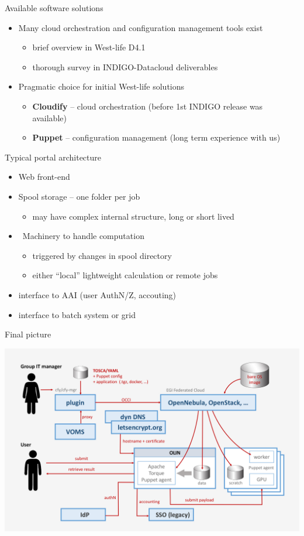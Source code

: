 \documentclass[smaller,t]{beamer}
\begin{document}
\begin{frame}{Available software solutions}
\begin{itemize}
\item Many cloud orchestration and configuration management tools exist
\begin{itemize}
\item brief overview in West-life D4.1
\item thorough survey in INDIGO-Datacloud deliverables
\end{itemize}
\item Pragmatic choice for initial West-life solutions
\begin{itemize}
\item \textbf{Cloudify} -- cloud orchestration (before 1st INDIGO release was available)
\item \textbf{Puppet} -- configuration management (long term experience with us) 
\end{itemize}
\end{itemize}
\end{frame}

\begin{frame}{Typical portal architecture}
\begin{itemize}
\item Web front-end
\item Spool storage -- one folder per job 
\begin{itemize}
\item may have complex internal structure, long or short lived
\end{itemize}
\item  Machinery to handle computation
\begin{itemize}
\item triggered by changes in spool directory
\item either ``local'' lightweight calculation or remote jobs 
\end{itemize}
\item interface to AAI (user AuthN/Z, accouting)
\item interface to batch system or grid
\end{itemize}
\end{frame}

\begin{frame}{Final picture}
\begin{center}
\includegraphics[width=.9\hsize]{P_virt.jpg}
\end{center}
\end{frame}
\end{document}
